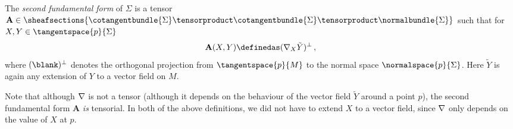 \documentclass[titlepage,numbers=noenddot,oneside,%
cleardoublepage=empty,paper=a4,fontsize=11pt,%
english,%
]{scrartcl}
\newcommand*{\mathcomma}{\,,}
\begin{document}
{\begin{definition}
    The \emph{second fundamental form} of \( \Sigma \) is a tensor \( \mathbf{A}\in \sheafsections{\cotangentbundle{\Sigma}\tensorproduct \cotangentbundle{\Sigma}\tensorproduct \normalbundle{\Sigma}} \) such that for \( X,Y\in \tangentspace{p}{\Sigma} \)
    \begin{equation*}
        \mathbf{A}(X,Y)\definedas (\Mconnection_X \tilde{Y})^\perp\mathcomma
    \end{equation*}
    where \( (\blank)^\perp \) denotes the orthogonal projection from \( \tangentspace{p}{M} \) to the normal space \( \normalspace{p}{\Sigma} \). Here \( \tilde{Y} \) is again any extension of \( Y \) to a vector field on \( M \).
\end{definition}  
Note that although \( \nabla \) is not a tensor (\ie although it depends on the behaviour of the vector field \( \tilde{Y} \) around a point \( p \)), the second fundamental form \( \mathbf{A} \) \emph{is} tensorial. In both of the above definitions, we did not have to extend \( X \) to a vector field, since \( \nabla \) only depends on the value of \( X \) at \( p \).

}
\end{document}
